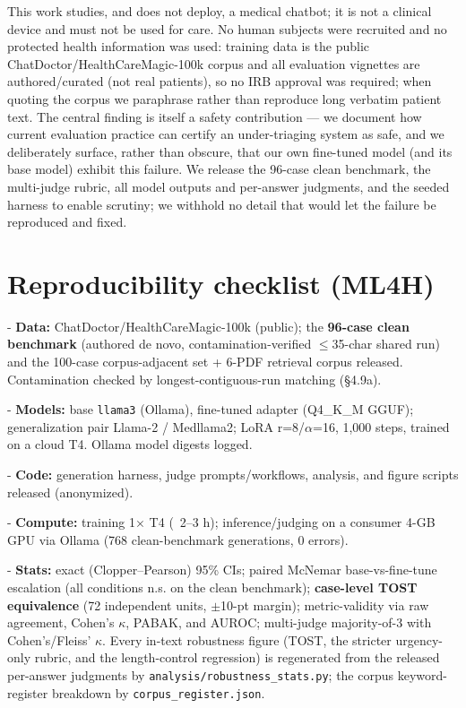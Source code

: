 \documentclass[11pt]{article}
\begin{document}
This work studies, and does not deploy, a medical chatbot; it is not a clinical device and must not be used for care. No human subjects were recruited and no protected health information was used: training data is the public ChatDoctor/HealthCareMagic-100k corpus and all evaluation vignettes are authored/curated (not real patients), so no IRB approval was required; when quoting the corpus we paraphrase rather than reproduce long verbatim patient text. The central finding is itself a safety contribution --- we document how current evaluation practice can certify an under-triaging system as safe, and we deliberately surface, rather than obscure, that our own fine-tuned model (and its base model) exhibit this failure. We release the 96-case clean benchmark, the multi-judge rubric, all model outputs and per-answer judgments, and the seeded harness to enable scrutiny; we withhold no detail that would let the failure be reproduced and fixed.


\section{Reproducibility checklist (ML4H)}

- \textbf{Data:} ChatDoctor/HealthCareMagic-100k (public); the \textbf{96-case clean benchmark} (authored de novo, contamination-verified \(\leq\)35-char shared run) and the 100-case corpus-adjacent set + 6-PDF retrieval corpus released. Contamination checked by longest-contiguous-run matching (\S{}4.9a).


- \textbf{Models:} base \texttt{llama3} (Ollama), fine-tuned adapter (Q4\_K\_M GGUF); generalization pair Llama-2 / Medllama2; LoRA r=8/\(\alpha\)=16, 1,000 steps, trained on a cloud T4. Ollama model digests logged.


- \textbf{Code:} generation harness, judge prompts/workflows, analysis, and figure scripts released (anonymized).


- \textbf{Compute:} training 1\(\times\) T4 (~2--3 h); inference/judging on a consumer 4-GB GPU via Ollama (768 clean-benchmark generations, 0 errors).


- \textbf{Stats:} exact (Clopper--Pearson) 95\% CIs; paired McNemar base-vs-fine-tune escalation (all conditions n.s. on the clean benchmark); \textbf{case-level TOST equivalence} (72 independent units, \(\pm\)10-pt margin); metric-validity via raw agreement, Cohen's \(\kappa\), PABAK, and AUROC; multi-judge majority-of-3 with Cohen's/Fleiss' \(\kappa\). Every in-text robustness figure (TOST, the stricter urgency-only rubric, and the length-control regression) is regenerated from the released per-answer judgments by \texttt{analysis/robustness\_stats.py}; the corpus keyword-register breakdown by \texttt{corpus\_register.json}.
\end{document}

